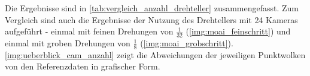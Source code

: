 \documentclass[./00PhotoBox.tex]{subfiles}
\begin{document}
Die Ergebnisse sind in \autoref{tab:vergleich_anzahl_drehteller} zusammengefasst. Zum Vergleich sind auch die Ergebnisse der Nutzung des Drehtellers mit 24 Kameras aufgeführt - einmal mit feinen Drehungen von $\frac{1}{32}$ (\autoref{img:moai_feinschritt}) und einmal mit groben Drehungen von $\frac{1}{8}$ (\autoref{img:moai_grobschritt}). \autoref{img:ueberblick_cam_anzahl} zeigt die Abweichungen der jeweiligen Punktwolken von den Referenzdaten in grafischer Form.


\begin{table}
    \centering
    \caption{Ergebnisse mit verschiedenen Kameraanzahlen und Drehteller}
    \label{tab:vergleich_anzahl_drehteller}
\end{table}
\end{document}
